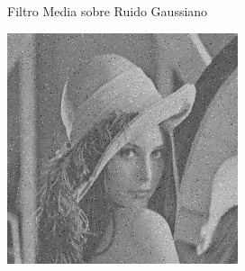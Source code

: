 \documentclass{beamer}
\begin{document}
\begin{frame}[fragile]{Filtro Media sobre Ruido Gaussiano}
\begin{minipage}{0.25\linewidth}
	\end{minipage}\hfill
	\begin{minipage}{0.25\linewidth}
		\centering
		\includegraphics[width=\linewidth]{../results/lena_gauss_sigma50}
	\end{minipage}
	

\end{frame}
\end{document}
